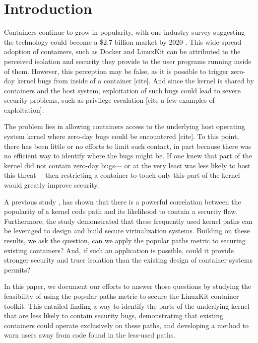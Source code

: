 \section{Introduction}
\label{sec.introduction}
Containers continue to grow in popularity, with one industry survey suggesting the technology could become a \$2.7 billion market by 2020 \cite{451-Research}.  
This wide-spread adoption of containers, such as Docker \cite{Docker} and LinuxKit \cite{LinuxKit} can be attributed to the perceived isolation and security they provide 
to the user programs running inside of them. 
However, this perception may be false, as it is possible to trigger zero-day kernel bugs from inside of a container [cite]. 
And since the kernel is shared by containers and the host system, exploitation of such bugs could lead to severe security problems, 
such as privilege escalation [cite a few examples of exploitation].  

The problem lies in allowing containers access to the underlying host operating system kernel where zero-day bugs could be encountered [cite]. 
To this point, there has been little or no efforts to limit such contact, in part because there was no efficient way to identify where the bugs might be. 
If one knew that part of the kernel did not contain zero-day bugs— or at the very least was less likely to host this threat— then 
restricting a container to touch only this part of the kernel would greatly improve security. 

A previous study \cite{Lock-in-Pop}, has shown that there is a powerful correlation between the popularity of a kernel code path and its likelihood to contain a security flaw. 
Furthermore, the study \cite{Lock-in-Pop} demonstrated that these frequently used kernel paths can be leveraged to design and build secure virtualization systems. 
Building on these results, we ask  the question, can we apply the popular paths metric to  securing existing containers? 
And, if such an application is possible, could it provide stronger security and truer isolation than the existing design of container systems permits?

In this paper, we document our efforts to answer those questions by studying the feasibility of using the popular paths metric to secure 
the LinuxKit container toolkit. This entailed finding a way to identify the parts of the underlying kernel that are less likely to contain security bugs, 
demonstrating that existing containers could operate exclusively on these paths, 
and developing a method to warn users away from code found in the less-used paths. 

